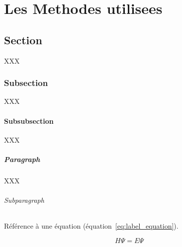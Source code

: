 \chapter{Les Methodes utilisees}
\label{chap:methodes_pratiques}
 
\section{Section}

XXX

\subsection{Subsection}

XXX

\subsubsection{Subsubsection}

XXX

\paragraph{Paragraph}

XXX

\subparagraph{Subparagraph}

Référence à une équation (équation~\ref{eq:label_equation}).

\begin{equation}
H \Psi = E \Psi
\label{eq:label_equation}
\end{equation}
